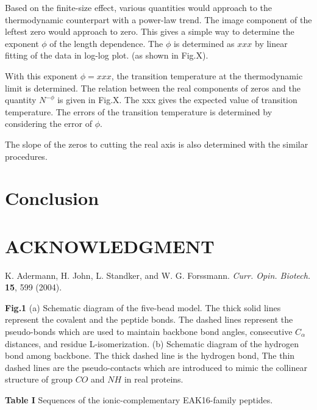 \documentclass[preprint,preprintnumbers,amsmath,amssymb,showpacs,pre]{revtex4-1}
\begin{document}
Based on the finite-size effect, various quantities would approach to the
thermodynamic counterpart with a power-law trend. The image component of
the leftest zero would approach to zero. This gives a simple way to
determine the exponent $\phi$ of the length dependence. The $\phi$ is
determined as $xxx$ by linear fitting of the data in log-log plot. (as
shown in Fig.X).

With this exponent $\phi=xxx$, the transition temperature at the
thermodynamic limit is determined. The relation between the real
components of zeros and the quantity $N^{-\phi}$ is given in Fig.X.
The xxx gives the expected value of transition temperature. The
errors of the transition temperature is determined by considering
the error of $\phi$.

The slope of the zeros to cutting the real axis is also determined
with the similar procedures.

\section{Conclusion}

\section*{ACKNOWLEDGMENT}

\begin{thebibliography}{10}

K. Adermann, H. John, L. Standker, and W. G. Forssmann.
{\it Curr. Opin. Biotech.} {\bf 15}, 599 (2004).

\end{thebibliography}

\newpage
\vspace{0.5cm}
\parindent 0pt {\large {\bf Fig.1}}
(a) Schematic diagram of the five-bead model. The thick solid lines
represent the covalent and the peptide bonds. The dashed lines
represent the pseudo-bonds which are used to maintain backbone bond
angles, consecutive $C_{\alpha}$ distances, and residue
L-isomerization. (b) Schematic diagram of the hydrogen bond among
backbone. The thick dashed line is the hydrogen bond, The thin
dashed lines are the pseudo-contacts which are introduced to mimic
the collinear structure of group $CO$ and $NH$ in real proteins.

\vspace{0.5cm}
\parindent 0pt {\large {\bf Table I}}
Sequences of the ionic-complementary EAK16-family peptides.
\end{document}
